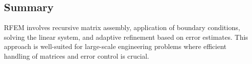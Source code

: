 \documentclass{article}
\begin{document}
\subsection*{Summary}
RFEM involves recursive matrix assembly, application of boundary conditions, solving the linear system, and adaptive refinement based on error estimates. This approach is well-suited for large-scale engineering problems where efficient handling of matrices and error control is crucial.
\end{document}
